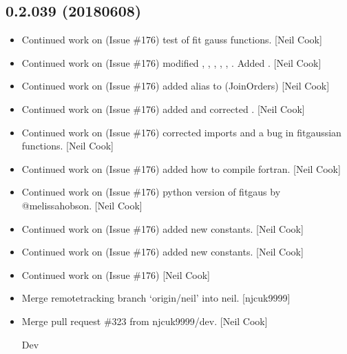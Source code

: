 \documentclass[a4paper,10pt,english]{report}
\begin{document}
\subsection{0.2.039 (2018\sphinxhyphen{}06\sphinxhyphen{}08)}
\label{\detokenize{misc/changelog:id444}}\begin{itemize}
\item {} 
Continued work on  (Issue \#176) \sphinxhyphen{} test of fit gauss functions.
{[}Neil Cook{]}

\item {} 
Continued work on  (Issue \#176) \sphinxhyphen{} modified
, , ,
, ,
. Added . {[}Neil Cook{]}

\item {} 
Continued work on  (Issue \#176) \sphinxhyphen{} added alias to
 (JoinOrders) {[}Neil Cook{]}

\item {} 
Continued work on  (Issue \#176) \sphinxhyphen{} added 
and corrected . {[}Neil Cook{]}

\item {} 
Continued work on  (Issue \#176) \sphinxhyphen{} corrected imports and a bug in
fitgaussian functions. {[}Neil Cook{]}

\item {} 
Continued work on  (Issue \#176) \sphinxhyphen{} added how to compile fortran.
{[}Neil Cook{]}

\item {} 
Continued work on  (Issue \#176) \sphinxhyphen{} python version of fitgaus by
@melissa\sphinxhyphen{}hobson. {[}Neil Cook{]}

\item {} 
Continued work on  (Issue \#176) \sphinxhyphen{} added new constants. {[}Neil
Cook{]}

\item {} 
Continued work on  (Issue \#176) \sphinxhyphen{} added new constants. {[}Neil
Cook{]}

\item {} 
Continued work on  (Issue \#176) {[}Neil Cook{]}

\item {} 
Merge remote\sphinxhyphen{}tracking branch ‘origin/neil’ into neil. {[}njcuk9999{]}

\item {} 
Merge pull request \#323 from njcuk9999/dev. {[}Neil Cook{]}

Dev

\end{itemize}
\end{document}
